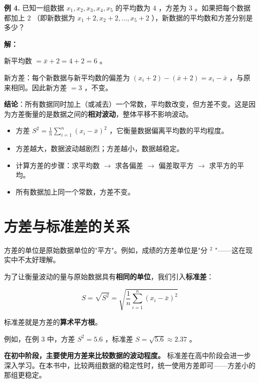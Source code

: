 \begin{workedexamples}
\textbf{例 4.} 已知一组数据 $x_1, x_2, x_3, x_4, x_5$ 的平均数为 $4$ ，方差为 $3$ 。如果把每个数据都加上 $2$ （即新数据为 $x_1+2, x_2+2, \ldots, x_5+2$ ），新数据的平均数和方差分别是多少？

\textbf{解：}

新平均数 $= \bar{x} + 2 = 4 + 2 = 6$ 。

新方差：每个新数据与新平均数的偏差为 $(x_i + 2) - (\bar{x} + 2) = x_i - \bar{x}$ ，与原来相同。因此新方差 $= 3$ ，不变。

\textbf{结论}：所有数据同时加上（或减去）一个常数，平均数改变，但方差不变。这是因为方差衡量的是数据之间的\textbf{相对波动}，整体平移不影响波动。

\end{workedexamples}

\begin{keytakeaway}


\begin{itemize}
  \item 方差 $S^2 = \frac{1}{n}\sum_{i=1}^{n}(x_i - \bar{x})^2$ ，它衡量数据偏离平均数的平均程度。
  \item 方差越大，数据波动越剧烈；方差越小，数据越稳定。
  \item 计算方差的步骤：求平均数 $\to$ 求各偏差 $\to$ 偏差取平方 $\to$ 求平方的平均。
  \item 所有数据加上同一个常数，方差不变。
\end{itemize}


\end{keytakeaway}



\section*{方差与标准差的关系}


\begin{understand}


方差的单位是原始数据单位的"平方"。例如，成绩的方差单位是"分 $^2$ "——这在现实中不太好理解。

为了让衡量波动的量与原始数据具有\textbf{相同的单位}，我们引入\textbf{标准差}：

\[
S = \sqrt{S^2} = \sqrt{\frac{1}{n}\sum_{i=1}^{n}(x_i - \bar{x})^2}
\]


标准差就是方差的\textbf{算术平方根}。

例如，在例 3 中，方差 $S^2 = 5.6$ ，标准差 $S = \sqrt{5.6} \approx 2.37$ 。

\textbf{在初中阶段，主要使用方差来比较数据的波动程度。} 标准差在高中阶段会进一步深入学习。在本书中，比较两组数据的稳定性时，统一使用方差即可——方差小的那组更稳定。

\end{understand}

